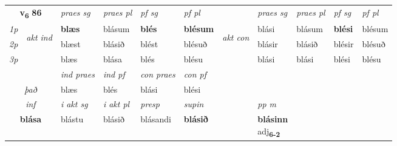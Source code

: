 \noindent
\begin{tabular}{lllllllllll} \toprule
\multicolumn{2}{c}{\textbf{v{\textsubscript{6}}} \Large{\textbf{86}}}  &  \textit{praes sg}  & \textit{praes pl}  &\textit{ pf sg} & \textit{pf pl} &  &  \textit{praes sg}  & \textit{praes pl}  & \textit{pf sg} & \textit{pf pl } \\*
	\cmidrule{3-6} \cmidrule{8-11}
 {\textit{1p}} & \multirow{3}{*}{\begin{turn}{90}\textit{akt ind}\end{turn}} & \textbf{blæs} & blásum & \textbf{blés} & \textbf{blésum} & \multirow{3}{*}{\begin{turn}{90}\textit{akt con}\end{turn}} &blási & blásum & \textbf{blési} & blésum\\*
 {\textit{2p}} &  &  blæst  & blásið & blést & blésuð & & blásir & blásið & blésir & blésuð \\*
{\textit{3p}} &  & blæs & blása & blés & blésu & & blási & blási& blési & blésu \\*
\cmidrule{3-6} \cmidrule{8-11}

   & &  \textit{ind praes} & \textit{ind pf} & \textit{con praes} & \textit{con pf} \\*
\multicolumn{2}{c}{ \textit{það} } & blæs & blés & blási & blési \\*

\cmidrule{3-8}
   \multicolumn{2}{c}{\textit{inf}}  & \textit{i akt sg} & \textit{i akt pl}   & \textit{presp} & \textit{supin}  && \textit{pp m} \\*
  \multicolumn{2}{c}{\textbf{blása}} & blástu  & blásið   & blásandi &  \textbf{blásið}  && \specialcell{\textbf{blásinn} \\ adj\textbf{\textsubscript{6-2}}} \\*
\end{tabular}

